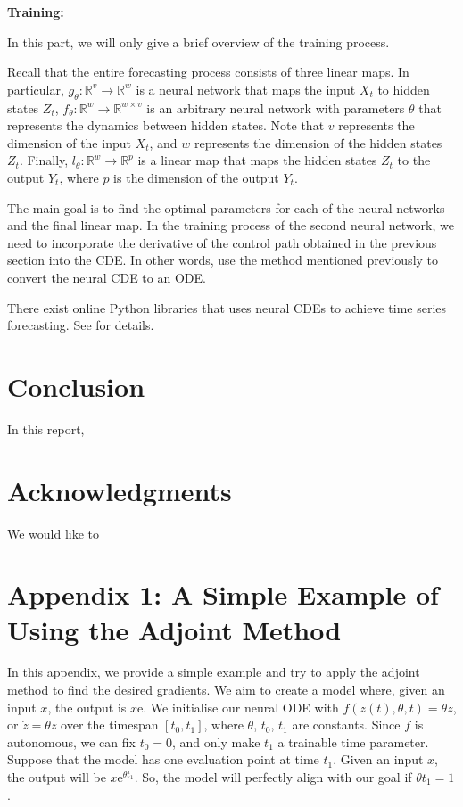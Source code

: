 \documentclass[a4paper,11pt,titlepage]{article}
\theoremstyle{definition}
\theoremstyle{plain}
\theoremstyle{remark}
\begin{document}
\textbf{Training:}

In this part, we will only give a brief overview of the training process.

Recall that the entire forecasting process consists of three linear maps. In particular, $g_\theta:\mathbb{R}^v\rightarrow\mathbb{R}^w$ is a neural network that maps the input $X_t$ to hidden states $Z_t$, $f_\theta:\mathbb{R}^w\rightarrow\mathbb{R}^{w\times v}$ is an arbitrary neural network with parameters $\theta$ that represents the dynamics between hidden states. Note that $v$ represents the dimension of the input $X_t$, and $w$ represents the dimension of the hidden states $Z_t$. Finally, $l_\theta:\mathbb{R}^w\rightarrow\mathbb{R}^p$ is a linear map that maps the hidden states $Z_t$ to the output $Y_t$, where $p$ is the dimension of the output $Y_t$.

The main goal is to find the optimal parameters for each of the neural networks and the final linear map. In the training process of the second neural network, we need to incorporate the derivative of the control path obtained in the previous section into the CDE. In other words, use the method mentioned previously to convert the neural CDE to an ODE.

There exist online Python libraries that uses neural CDEs to achieve time series forecasting. See \cite{Jhin2023} for details.

\pagebreak
\section{Conclusion}

In this report,

\section*{Acknowledgments}

We would like to

\appendix

\pagebreak
\section{Appendix 1: A Simple Example of Using the Adjoint Method}

In this appendix, we provide a simple example and try to apply the adjoint method to find the desired gradients. We aim to create a model where, given an input $x$, the output is $x\mathrm{e}$. We initialise our neural ODE with $f(z(t),\theta,t)=\theta z$, or $\dot{z}=\theta z$ over the timespan $[t_0,t_1]$, where $\theta$, $t_0$, $t_1$ are constants. Since $f$ is autonomous, we can fix $t_0 = 0$, and only make $t_1$ a trainable time parameter. Suppose that the model has one evaluation point at time $t_1$. Given an input $x$, the output will be $x\mathrm{e}^{\theta t_1}$. So, the model will perfectly align with our goal if $\theta t_1=1$.
\end{document}
